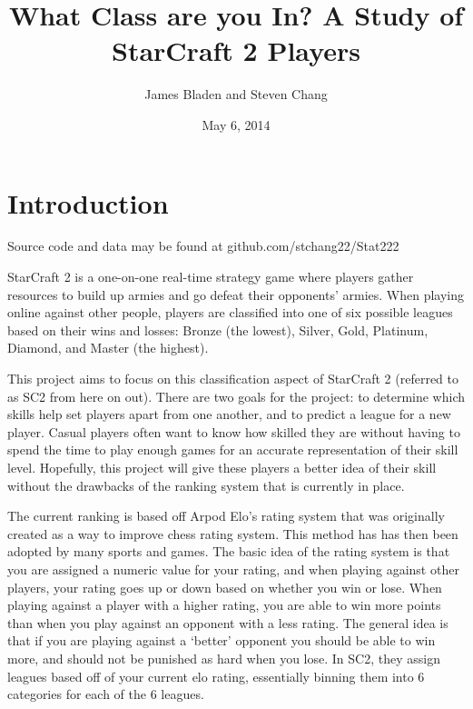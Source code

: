 \documentclass[letterpaper,10pt,english]{/usr/share/sphinx/texinputs/sphinxhowto}
\title{What Class are you In? A Study of StarCraft 2 Players}
\date{May 6, 2014}
\author{James Bladen and Steven Chang}
\begin{document}
        
            \maketitle
        

        


        
        \part{Introduction}Source code and data may be found at github.com/stchang22/Stat222

StarCraft 2 is a one-on-one real-time strategy game where players gather
resources to build up armies and go defeat their opponents' armies. When
playing online against other people, players are classified into one of
six possible leagues based on their wins and losses: Bronze (the
lowest), Silver, Gold, Platinum, Diamond, and Master (the highest).

This project aims to focus on this classification aspect of StarCraft 2
(referred to as SC2 from here on out). There are two goals for the
project: to determine which skills help set players apart from one
another, and to predict a league for a new player. Casual players often
want to know how skilled they are without having to spend the time to
play enough games for an accurate representation of their skill level.
Hopefully, this project will give these players a better idea of their
skill without the drawbacks of the ranking system that is currently in
place.

The current ranking is based off Arpod Elo's rating system that was
originally created as a way to improve chess rating system. This method
has has then been adopted by many sports and games. The basic idea of
the rating system is that you are assigned a numeric value for your
rating, and when playing against other players, your rating goes up or
down based on whether you win or lose. When playing against a player
with a higher rating, you are able to win more points than when you play
against an opponent with a less rating. The general idea is that if you
are playing against a `better' opponent you should be able to win more,
and should not be punished as hard when you lose. In SC2, they assign
leagues based off of your current elo rating, essentially binning them
into 6 categories for each of the 6 leagues.
\end{document}

